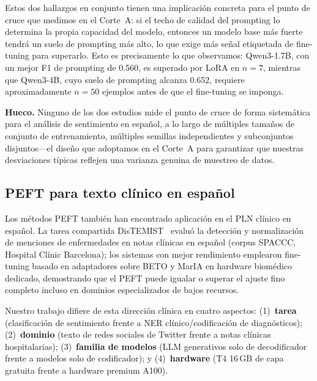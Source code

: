 \documentclass[conference]{IEEEtran}
\begin{document}
Estos dos hallazgos en conjunto tienen una implicación concreta para el punto de
cruce que medimos en el Corte~A: si el techo de calidad del prompting lo
determina la propia capacidad del modelo, entonces un modelo base más fuerte
tendrá un suelo de prompting más alto, lo que exige más señal etiquetada de
fine-tuning para superarlo.
Esto es precisamente lo que observamos: Qwen3-1.7B, con un mejor F1 de prompting
de 0.560, es superado por LoRA en $n=7$, mientras que Qwen3-4B, cuyo suelo de
prompting alcanza 0.652, requiere aproximadamente $n=50$ ejemplos antes de que
el fine-tuning se imponga.

\textbf{Hueco.}
Ninguno de los dos estudios mide el punto de cruce de forma sistemática para el
análisis de sentimiento en español, a lo largo de múltiples tamaños de conjunto
de entrenamiento, múltiples semillas independientes y subconjuntos
disjuntos---el diseño que adoptamos en el Corte~A para garantizar que nuestras
desviaciones típicas reflejen una varianza genuina de muestreo de datos.

\subsection{PEFT para texto clínico en español}
\label{sec:related_clinical}

Los métodos PEFT también han encontrado aplicación en el PLN clínico en español.
La tarea compartida DisTEMIST~\cite{mirandaescalada2023distemist} evaluó la
detección y normalización de menciones de enfermedades en notas clínicas en
español (corpus SPACCC, Hospital Cl\'{i}nic Barcelona); los sistemas con mejor
rendimiento emplearon fine-tuning basado en adaptadores sobre BETO y MarIA en
hardware biomédico dedicado, demostrando que el PEFT puede igualar o superar el
ajuste fino completo incluso en dominios especializados de bajos recursos.

Nuestro trabajo difiere de esta dirección clínica en cuatro aspectos:
(1)~\textbf{tarea} (clasificación de sentimiento frente a NER
clínico/codificación de diagnósticos); (2)~\textbf{dominio} (texto de redes
sociales de Twitter frente a notas clínicas hospitalarias); (3)~\textbf{familia
de modelos} (LLM generativos solo de decodificador frente a modelos solo de
codificador); y (4)~\textbf{hardware} (T4 16\,GB de capa gratuita frente a
hardware premium A100).
\end{document}

